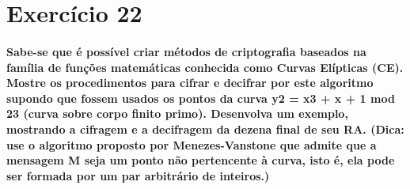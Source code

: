 \documentclass[10pt,a4paper]{report}
\begin{document}
\section*{Exercício 22}
\paragraph{Sabe-se que é possível criar métodos de criptografia baseados na família de funções matemáticas conhecida como Curvas Elípticas (CE). Mostre os procedimentos para cifrar e decifrar por este algoritmo supondo que fossem usados os pontos da curva y2 = x3 + x + 1 mod 23 (curva sobre corpo finito primo). Desenvolva um exemplo, mostrando a cifragem e a decifragem da dezena final de seu RA. (Dica: use o algoritmo proposto por Menezes-Vanstone que admite que a mensagem M seja um ponto não pertencente à curva, isto é, ela pode ser formada por um par arbitrário de inteiros.)}
\end{document}
